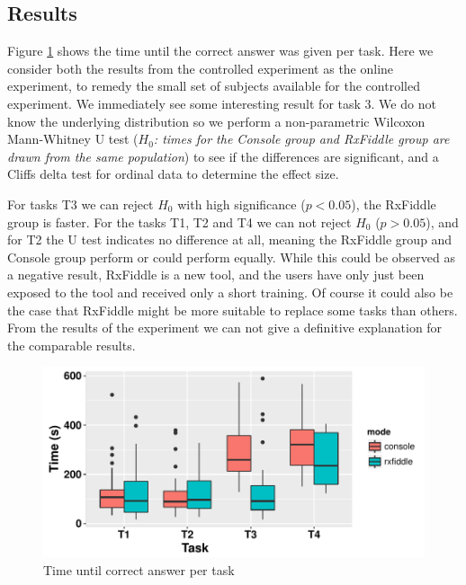 \subsection{Results}
Figure \ref{fig-timePerTask} shows the time until the correct answer was given per task. Here we consider both the results from the controlled experiment as the online experiment, to remedy the small set of subjects available for the controlled experiment. We immediately see some interesting result for task 3. We do not know the underlying distribution so we perform a non-parametric Wilcoxon Mann-Whitney U test (\textit{$H_0$: times for the Console group and RxFiddle group are drawn from the same population}) to see if the differences are significant, and a Cliffs delta test for ordinal data to determine the effect size.

\begin{centering}

\end{centering}

For tasks T3 we can reject $H_0$ with high significance ($p < 0.05$), the RxFiddle group is faster.
For the tasks T1, T2 and T4 we can not reject $H_0$ ($p > 0.05$), and for T2 the U test indicates no difference at all, meaning the RxFiddle group and Console group perform or could perform equally. While this could be observed as a negative result, RxFiddle is a new tool, and the users have only just been exposed to the tool and received only a short training. Of course it could also be the case  that RxFiddle might be more suitable to replace some tasks than others. From the results of the experiment we can not give a definitive explanation for the comparable results.

\begin{figure}[h]
\includegraphics[width=\columnwidth]{images/timePerTask.pdf}
\caption{Time until correct answer per task}
\label{fig-timePerTask}
\end{figure}
